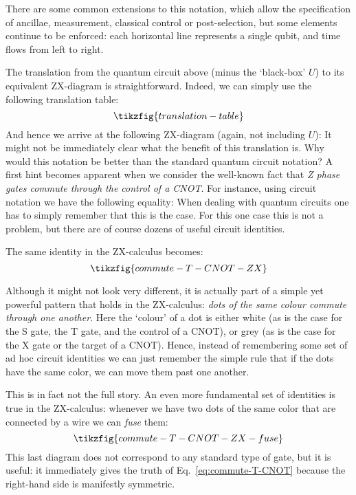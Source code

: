 \documentclass[a4paper,onecolumn,superscriptaddress,11pt,%
				unpublished,%
				allowfontchageintitle,%
				]{quantumarticle}
\begin{document}
There are some common extensions to this notation, which allow the specification of ancillae, measurement, classical control or post-selection, but some elements continue to be enforced: each horizontal line represents a single qubit, and time flows from left to right.

The translation from the quantum circuit above (minus the `black-box' $U$) to its equivalent ZX-diagram is straightforward. Indeed, we can simply use the following translation table:
\begin{equation}\label{eq:translation-table}
\tikzfig{translation-table}
\end{equation}
And hence we arrive at the following ZX-diagram (again, not including $U$):
It might not be immediately clear what the benefit of this translation is. Why would this notation be better than the standard quantum circuit notation?
A first hint becomes apparent when we consider the well-known fact that \emph{Z phase gates commute through the control of a CNOT}. For instance, using circuit notation we have the following equality:
When dealing with quantum circuits one has to simply remember that this is the case. For this one case this is not a problem, but there are of course dozens of useful circuit identities.

The same identity in the ZX-calculus becomes:
\begin{equation}\label{eq:commute-T-CNOT}
\tikzfig{commute-T-CNOT-ZX}
\end{equation}

Although it might not look very different, it is actually part of a simple yet powerful pattern that holds in the ZX-calculus: \emph{dots of the same colour commute through one another}. Here the `colour' of a dot is either white (as is the case for the S gate, the T gate, and the control of a CNOT), or grey (as is the case for the X gate or the target of a CNOT).
Hence, instead of remembering some set of ad hoc circuit identities we can just remember the simple rule that if the dots have the same color, we can move them past one another.

This is in fact not the full story. An even more fundamental set of identities is true in the ZX-calculus: whenever we have two dots of the same color that are connected by a wire we can \emph{fuse} them:
\begin{equation}
\tikzfig{commute-T-CNOT-ZX-fuse}
\end{equation}
This last diagram does not correspond to any standard type of gate, but it is useful: it immediately gives the truth of Eq.~\eqref{eq:commute-T-CNOT} because the right-hand side is manifestly symmetric.
\end{document}

